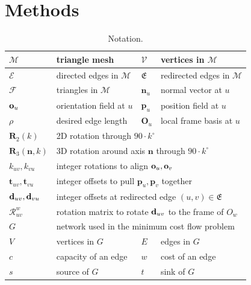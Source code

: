 \section{Methods}
\label{sec:quad-method}
\begin{table}
\centering
\caption{Notation.}
\label{tab:quad-notation}
\begin{tabular}{|l|l|l|l|}
\hline
$\mathcal{M}$ & triangle mesh &
$\mathcal{V}$ & vertices in $\mathcal{M}$\\
\hline
$\mathcal{E}$ & directed edges in $\mathcal{M}$ &
$\mathfrak{E}$ & redirected edges in $\mathcal{M}$\\
\hline
$\mathcal{F}$ & triangles in $\mathcal{M}$ &
$\mathbf{n}_u$ & normal vector at $u$ \\
\hline
$\mathbf{o}_u$ & orientation field at $u$ &
$\mathbf{p}_u$ & position field at $u$\\
\hline
$\rho$ & desired edge length &
$\mathbf{O}_u$ & local frame basis at $u$ \\
\hline
$\mathbf{R}_2(k)$ & \multicolumn{3}{l|}{2D rotation through $90 \cdot k^\circ$}\\
\hline
$\mathbf{R}_3(\mathbf{n},k)$ & \multicolumn{3}{l|}{3D rotation around axis $\mathbf{n}$ through $90 \cdot k^\circ$}\\
\hline
$k_{uv},k_{vu}$ & \multicolumn{3}{l|}{integer rotations to align $\mathbf{o}_u,\mathbf{o}_v$}\\
\hline
$\mathbf{t}_{uv},\mathbf{t}_{vu}$ & \multicolumn{3}{l|}{integer offsets to pull $\mathbf{p}_u,\mathbf{p}_v$ together}\\
\hline
${\mathbf{d}}_{uv},{\mathbf{d}}_{vu}$ & \multicolumn{3}{l|}{integer offsets at redirected edge $(u,v)\in\mathfrak{E}$}\\
\hline
$\mathcal{R}^w_{uv}$ & \multicolumn{3}{l|}{rotation matrix to rotate ${\mathbf{d}}_{uv}$ to the frame of $O_w$} \\
\hline
$G$ & \multicolumn{3}{l|}{ network used in the minimum cost flow problem} \\
\hline
$V$ & vertices in $G$ &
$E$ & edges in $G$ \\
\hline
$c$ & capacity of an edge &
$w$ & cost of an edge \\
\hline
$s$ & source of $G$ &
$t$ & sink of $G$ \\
\hline
\end{tabular}
\end{table}


